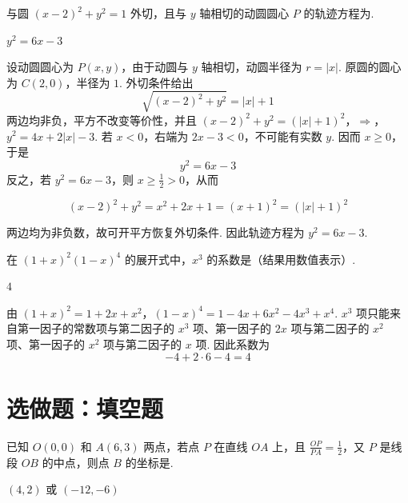 \begin{problem}
与圆 \((x-2)^2+y^2=1\) 外切，且与 \(y\) 轴相切的动圆圆心 \(P\) 的轨迹方程为\fillinblank{}.
\end{problem}

\begin{answer}
\(y^2=6x-3\)
\end{answer}

\begin{solution}
设动圆圆心为 \(P(x,y)\)，由于动圆与 \(y\) 轴相切，动圆半径为 \(r=|x|\). 原圆的圆心为 \(C(2,0)\)，半径为 \(1\). 外切条件给出
\[
\sqrt{(x-2)^2+y^2}=|x|+1
\]
两边均非负，平方不改变等价性，并且
\((x-2)^2+y^2=(|x|+1)^2\)，\(\Longrightarrow\)，\(y^2=4x+2|x|-3\).
若 \(x<0\)，右端为 \(2x-3<0\)，不可能有实数 \(y\). 因而 \(x\geq0\)，于是
\[
y^2=6x-3
\]
反之，若 \(y^2=6x-3\)，则 \(x\geq\frac{1}{2}>0\)，从而

\[
(x-2)^2+y^2=x^2+2x+1=(x+1)^2=(|x|+1)^2
\]

两边均为非负数，故可开平方恢复外切条件. 因此轨迹方程为 \(y^2=6x-3\).
\end{solution}

\begin{problem}
在 \(\left(1+x\right)^2\left(1-x\right)^4\) 的展开式中，\(x^3\) 的系数是（结果用数值表示）\fillinblank{}.
\end{problem}

\begin{answer}
\(4\)
\end{answer}

\begin{solution}
由
\((1+x)^2=1+2x+x^2\)，\((1-x)^4=1-4x+6x^2-4x^3+x^4\).
\(x^3\) 项只能来自第一因子的常数项与第二因子的 \(x^3\) 项、第一因子的 \(2x\) 项与第二因子的 \(x^2\) 项、第一因子的 \(x^2\) 项与第二因子的 \(x\) 项. 因此系数为
\[
-4+2\cdot6-4=4
\]
\end{solution}

\section{选做题：填空题}

\begin{problem}[A]
已知 \(O(0,0)\) 和 \(A(6,3)\) 两点，若点 \(P\) 在直线 \(OA\) 上，且 \(\frac{OP}{PA}=\frac{1}{2}\)，又 \(P\) 是线段 \(OB\) 的中点，则点 \(B\) 的坐标是\fillinblank{}.
\end{problem}

\begin{answer}
\((4,2)\) 或 \((-12,-6)\)
\end{answer}

